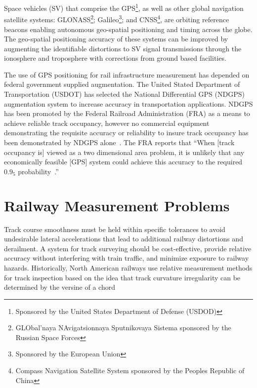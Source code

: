 Space vehicles (SV) that comprise the GPS\footnote{Sponsored by the United States Department of Defense (USDOD)}, as well as other global navigation satellite systems: GLONASS\footnote{GLObal'naya NAvigatsionnaya Sputnikovaya Sistema  sponsored by the Russian Space Forces}; Galileo\footnote{Sponsored by the European Union}; and CNSS\footnote{Compass Navigation Satellite System sponsored by the Peoples Republic of China}, are orbiting reference beacons enabling autonomous geo-spatial positioning and timing across the globe. The geo-spatial positioning accuracy of these systems can be improved by augmenting the identifiable distortions to SV signal transmissions through the ionosphere and troposphere with corrections from ground based facilities. 

The use of GPS positioning for rail infrastructure measurement has depended on federal government supplied augmentation. The United Stated Department of Transportation (USDOT) has selected the National Differential GPS (NDGPS) augmentation system to increase accuracy in transportation applications. NDGPS has been promoted by the Federal Railroad Administration (FRA) as a means to achieve reliable track occupancy, however no commercial equipment demonstrating the requisite accuracy or reliability to insure track occupancy has been demonstrated by NDGPS alone~\citep{2006AllenAssetMap}. The FRA reports that ``When [track occupancy is] viewed as a two dimensional area problem, it is unlikely that any economically feasible [GPS] system could achieve this accuracy to the required $0.9_5$ probability~\citep[pp.6-7]{1995FRADiffe}.''


\section{Railway Measurement Problems}
Track course smoothness must be held within specific tolerances to avoid undesirable lateral accelerations that lead to additional railway distortions and derailment. A system for track surveying should be cost-effective, provide relative accuracy without interfering with train traffic, and minimize exposure to railway hazards. Historically, North American railways use relative measurement methods for track inspection based on the idea that track curvature irregularity can be determined by the versine of a chord

